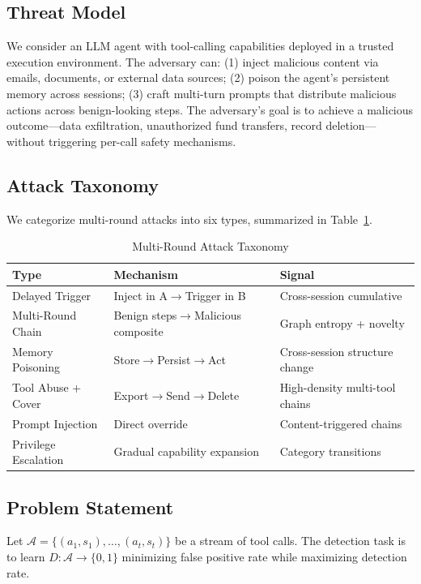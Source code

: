 \documentclass[conference]{IEEEtran}
\begin{document}
\subsection{Threat Model}
We consider an LLM agent with tool-calling capabilities deployed in a trusted execution environment. The adversary can: (1) inject malicious content via emails, documents, or external data sources; (2) poison the agent's persistent memory across sessions; (3) craft multi-turn prompts that distribute malicious actions across benign-looking steps. The adversary's goal is to achieve a malicious outcome---data exfiltration, unauthorized fund transfers, record deletion---without triggering per-call safety mechanisms.

\subsection{Attack Taxonomy}
We categorize multi-round attacks into six types, summarized in Table~\ref{tab:taxonomy}.

\begin{table}[t]
\centering
\caption{Multi-Round Attack Taxonomy}
\label{tab:taxonomy}
\small
\begin{tabular}{p{2.2cm}p{3.5cm}p{3cm}}
\toprule
\textbf{Type} & \textbf{Mechanism} & \textbf{Signal} \\
\midrule
Delayed Trigger & Inject in A$\rightarrow$Trigger in B & Cross-session cumulative \\
Multi-Round Chain & Benign steps$\rightarrow$Malicious composite & Graph entropy + novelty \\
Memory Poisoning & Store$\rightarrow$Persist$\rightarrow$Act & Cross-session structure change \\
Tool Abuse + Cover & Export$\rightarrow$Send$\rightarrow$Delete & High-density multi-tool chains \\
Prompt Injection & Direct override & Content-triggered chains \\
Privilege Escalation & Gradual capability expansion & Category transitions \\
\bottomrule
\end{tabular}
\end{table}

\subsection{Problem Statement}
Let $\mathcal{A} = \{(a_1, s_1), \ldots, (a_t, s_t)\}$ be a stream of tool calls. The detection task is to learn $D: \mathcal{A} \rightarrow \{0, 1\}$ minimizing false positive rate while maximizing detection rate.
\end{document}
